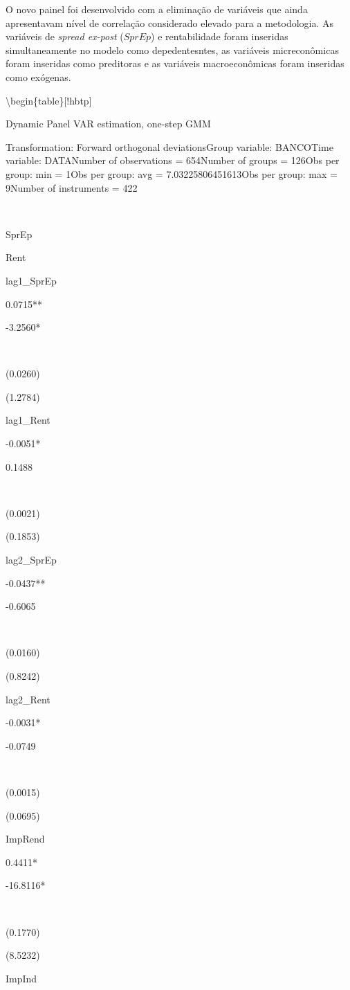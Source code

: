 \documentclass[12pt,12pt,openright,oneside,a4paper,chapter=TITLE,section=TITLE,subsection=TITLE,subsubsection=TITLE,english,french,spanish,portugues,sumario=tradicional]{abntex2}
\begin{document}
O novo painel foi desenvolvido com a eliminação de variáveis que ainda apresentavam nível de correlação considerado elevado para a metodologia. As variáveis de \emph{spread ex-post} (\(SprEp\)) e rentabilidade foram inseridas simultaneamente no modelo como depedentesntes, as variáveis micreconômicas foram inseridas como preditoras e as variáveis macroeconômicas foram inseridas como exógenas.

\textbackslash{}begin\{table\}{[}!hbtp{]}
\vspace{-2mm}

Dynamic Panel VAR estimation, one-step GMM

Transformation: Forward orthogonal deviationsGroup variable: BANCOTime variable: DATANumber of observations = 654Number of groups = 126Obs per group: min = 1Obs per group: avg = 7.03225806451613Obs per group: max = 9Number of instruments = 422

~

SprEp

Rent

lag1\_SprEp

0.0715**

-3.2560*

~

(0.0260)

(1.2784)

lag1\_Rent

-0.0051*

0.1488

~

(0.0021)

(0.1853)

lag2\_SprEp

-0.0437**

-0.6065

~

(0.0160)

(0.8242)

lag2\_Rent

-0.0031*

-0.0749

~

(0.0015)

(0.0695)

ImpRend

0.4411*

-16.8116*

~

(0.1770)

(8.5232)

ImpInd
\end{document}
